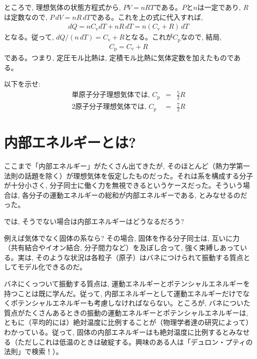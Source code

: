 ところで, 理想気体の状態方程式から, $PV=nRT$である。$P$と$n$は一定であり, 
$R$は定数なので, $P\,dV=nR\,dT$である。これを上の式に代入すれば, 
\begin{eqnarray}
dQ=nC_{\text{v}}dT+nR\,dT=n(C_{\text{v}}+R)\,dT
\end{eqnarray}
となる。従って, $dQ/(n\,dT)=C_{\text{v}}+R$となる。これが$C_\text{p}$なので, 結局, 
\begin{eqnarray}
C_{\text{p}}=C_{\text{v}}+R\label{eq:Cp_equal_Cv_plus_R}
\end{eqnarray}
である。つまり, 定圧モル比熱は, 定積モル比熱に気体定数を加えたものである。

\begin{q} 以下を示せ:
\begin{eqnarray}
\text{単原子分子理想気体では, }C_{\text{p}}&=&\frac{5}{2}R\label{eq:Cp_monomol}\\
\text{2原子分子理想気体では, }C_{\text{p}}&=&\frac{7}{2}R\label{eq:Cp_2mol}
\end{eqnarray}
\end{q}


\section{内部エネルギーとは?}

ここまで「内部エネルギー」がたくさん出てきたが, そのほとんど（熱力学第一法則の話題を除く）が理想気体を仮定したものだった。それは系を構成する分子が十分小さく, 分子同士に働く力を無視できるというケースだった。そういう場合は, 各分子の運動エネルギーの総和が内部エネルギーである, とみなせるのだった。

では, そうでない場合は内部エネルギーはどうなるだろう? 
\mv

例えば気体でなく固体の系なら? その場合, 固体を作る分子同士は, 互いに力（共有結合やイオン結合, 分子間力など）を及ぼし合って, 強く束縛しあっている。実は, そのような状況は各粒子（原子）はバネにつけられて振動する質点としてモデル化できるのだ。

バネにくっついて振動する質点は, 運動エネルギーとポテンシャルエネルギーを持つことは既に学んだ。従って, 内部エネルギーとして運動エネルギーだけでなくポテンシャルエネルギーも考慮しなければならない。ところが, バネについた質点がたくさんあるときの振動の運動エネルギーとポテンシャルエネルギーは, ともに（平均的には）絶対温度に比例することが（物理学者達の研究によって）わかっている。従って, 固体の内部エネルギーはも絶対温度に比例するとみなせる（ただしこれは低温のときは破綻する。興味のある人は「デュロン・プティの法則」で検索！）。
\mv

